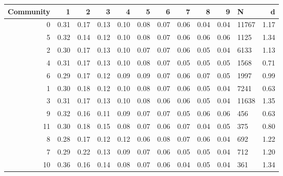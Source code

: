 \begin{tabular}{rrrrrrrrrrlr}
\toprule
 Community &    1 &    2 &    3 &    4 &    5 &    6 &    7 &    8 &    9 &      N &    d \\
\midrule
         0 & 0.31 & 0.17 & 0.13 & 0.10 & 0.08 & 0.07 & 0.06 & 0.04 & 0.04 &  11767 & 1.17 \\
         5 & 0.32 & 0.14 & 0.12 & 0.10 & 0.08 & 0.07 & 0.06 & 0.06 & 0.06 &   1125 & 1.34 \\
         2 & 0.30 & 0.17 & 0.13 & 0.10 & 0.07 & 0.07 & 0.06 & 0.05 & 0.04 &   6133 & 1.13 \\
         4 & 0.31 & 0.17 & 0.13 & 0.10 & 0.08 & 0.07 & 0.05 & 0.05 & 0.05 &   1568 & 0.71 \\
         6 & 0.29 & 0.17 & 0.12 & 0.09 & 0.09 & 0.07 & 0.06 & 0.07 & 0.05 &   1997 & 0.99 \\
         1 & 0.30 & 0.18 & 0.12 & 0.10 & 0.08 & 0.07 & 0.06 & 0.05 & 0.04 &   7241 & 0.63 \\
         3 & 0.31 & 0.17 & 0.13 & 0.10 & 0.08 & 0.06 & 0.06 & 0.05 & 0.04 &  11638 & 1.35 \\
         9 & 0.32 & 0.16 & 0.11 & 0.09 & 0.07 & 0.07 & 0.05 & 0.06 & 0.06 &    456 & 0.63 \\
        11 & 0.30 & 0.18 & 0.15 & 0.08 & 0.07 & 0.06 & 0.07 & 0.04 & 0.05 &    375 & 0.80 \\
         8 & 0.28 & 0.17 & 0.12 & 0.12 & 0.06 & 0.08 & 0.07 & 0.06 & 0.04 &    692 & 1.22 \\
         7 & 0.29 & 0.22 & 0.13 & 0.09 & 0.07 & 0.06 & 0.05 & 0.05 & 0.04 &    712 & 1.20 \\
        10 & 0.36 & 0.16 & 0.14 & 0.08 & 0.07 & 0.06 & 0.04 & 0.05 & 0.04 &    361 & 1.34 \\
\bottomrule
\end{tabular}
